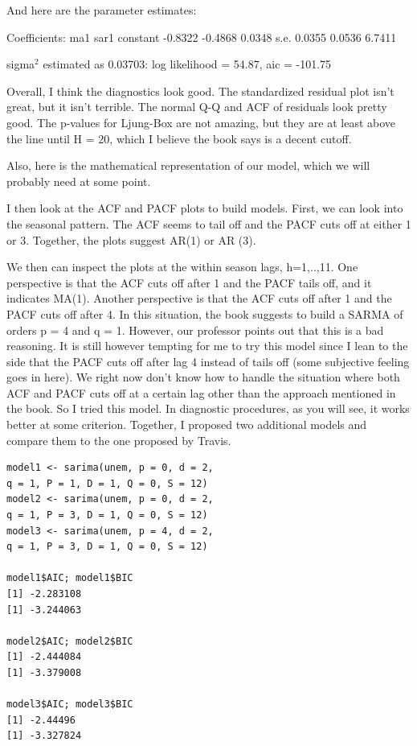 \documentclass[twoside,twocolumn]{article}
\begin{document}
And here are the parameter estimates:

Coefficients:
ma1 sar1 constant
-0.8322 -0.4868 0.0348
s.e. 0.0355 0.0536 6.7411

sigma\(^2\) estimated as 0.03703: log likelihood = 54.87, aic = -101.75

Overall, I think the diagnostics look good. The standardized residual plot isn't great, but it isn't terrible. The normal Q-Q and ACF of residuals look pretty good. The p-values for Ljung-Box are not amazing, but they are at least above the line until H = 20, which I believe the book says is a decent cutoff.

Also, here is the mathematical representation of our model, which we will probably need at some point. 

I then look at the ACF and PACF plots to build models. First, we can look into the seasonal pattern. The ACF seems to tail off and the PACF cuts off at either 1 or 3. Together, the plots suggest AR(1) or AR (3).

We then can inspect the plots at the within season lags, h=1,..,11. One perspective is that the ACF cuts off after 1 and the PACF tails off, and it indicates MA(1). Another perspective is that the ACF cuts off after 1 and the PACF cuts off after 4. In this situation, the book suggests to build a SARMA of orders p = 4 and q = 1. However, our professor points out that this is a bad reasoning. It is still however tempting for me to try this model since I lean to the side that the PACF cuts off after lag 4 instead of tails off (some subjective feeling goes in here). We right now don't know how to handle the situation where both ACF and PACF cuts off at a certain lag other than the approach mentioned in the book. So I tried this model. In diagnostic procedures, as you will see, it works better at some criterion. Together, I proposed two additional models and compare them to the one proposed by Travis.

\begin{verbatim}
model1 <- sarima(unem, p = 0, d = 2, 
q = 1, P = 1, D = 1, Q = 0, S = 12)
model2 <- sarima(unem, p = 0, d = 2, 
q = 1, P = 3, D = 1, Q = 0, S = 12)
model3 <- sarima(unem, p = 4, d = 2, 
q = 1, P = 3, D = 1, Q = 0, S = 12)

model1$AIC; model1$BIC
[1] -2.283108
[1] -3.244063

model2$AIC; model2$BIC
[1] -2.444084
[1] -3.379008

model3$AIC; model3$BIC
[1] -2.44496
[1] -3.327824
\end{verbatim}
\end{document}
